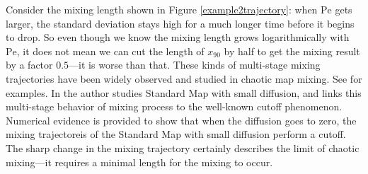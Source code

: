 Consider the mixing length shown in Figure \ref{example2trajectory}: when $\text{Pe}$ gets larger, the standard deviation stays high for a much longer
time before it begins to drop. So even though we know the mixing length grows logarithmically with $\text{Pe}$,
it does not mean we can cut the length of $x_{90}$ by half to get the mixing result by a factor
$0.5$---it is worse than that. These kinds of multi-stage mixing trajectories have been widely observed
and studied in chaotic map mixing.
See \cite{Thiffeault2003-13, Thiffeault2003-309, Thiffeault2004, Tsang2005, Haynes2005}
for examples. In \cite{numcutoff} the author studies Standard Map with small diffusion, and links
this multi-stage behavior of mixing process to the well-known cutoff phenomenon. Numerical evidence is provided to show that when the diffusion goes to zero, the mixing trajectoreis of the Standard Map with small diffusion perform a cutoff. The sharp change in the mixing trajectory certainly
describes the limit of chaotic mixing---it requires a minimal length for the mixing to occur.


